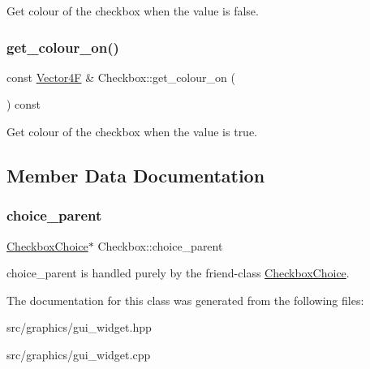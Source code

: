 Get colour of the checkbox when the value is false. \mbox{\label{class_checkbox_accb44cc4cde3fe6ad7a88b27831fa37a}} 
\subsubsection{\texorpdfstring{get\+\_\+colour\+\_\+on()}{get\_colour\_on()}}
{\footnotesize\ttfamily const \mbox{\hyperlink{class_vector4}{Vector4F}} \& Checkbox\+::get\+\_\+colour\+\_\+on (\begin{DoxyParamCaption}{ }\end{DoxyParamCaption}) const}

Get colour of the checkbox when the value is true. 

\subsection{Member Data Documentation}
\mbox{\label{class_checkbox_adf30cd14778fdae212e6c97ec456a700}} 
\subsubsection{\texorpdfstring{choice\+\_\+parent}{choice\_parent}}
{\footnotesize\ttfamily \mbox{\hyperlink{class_checkbox_choice}{Checkbox\+Choice}}$\ast$ Checkbox\+::choice\+\_\+parent\hspace{0.3cm}{\ttfamily [protected]}}

choice\+\_\+parent is handled purely by the friend-\/class \mbox{\hyperlink{class_checkbox_choice}{Checkbox\+Choice}}. 

The documentation for this class was generated from the following files\+:\begin{DoxyCompactItemize}
\item 
src/graphics/gui\+\_\+widget.\+hpp\item 
src/graphics/gui\+\_\+widget.\+cpp\end{DoxyCompactItemize}
